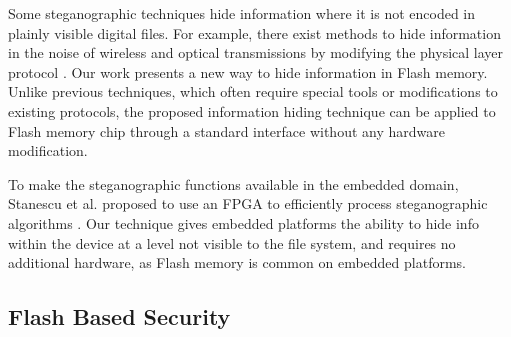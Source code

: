 Some steganographic
techniques hide information where it is not encoded in plainly
visible digital files. For example, there exist methods to hide
information in the noise of wireless and optical transmissions
by modifying the physical layer protocol
\cite{802comm,80211ofdmsteg,opticalsteg2009}. 
Our work presents a new way to hide
information in Flash memory. Unlike previous techniques, which
often require special tools or modifications to existing
protocols, the proposed information hiding technique can be
applied to Flash memory chip through a standard interface
without any hardware modification.

To make
the steganographic functions available in the embedded domain,
Stanescu et al. proposed to use an FPGA to efficiently process
steganographic algorithms \cite{steganographyembedded}. Our 
technique gives embedded platforms the ability to hide info 
within the device at a level not visible to the file system,
and requires no additional hardware, as Flash memory is common
on embedded platforms.









\subsection{Flash Based Security}


